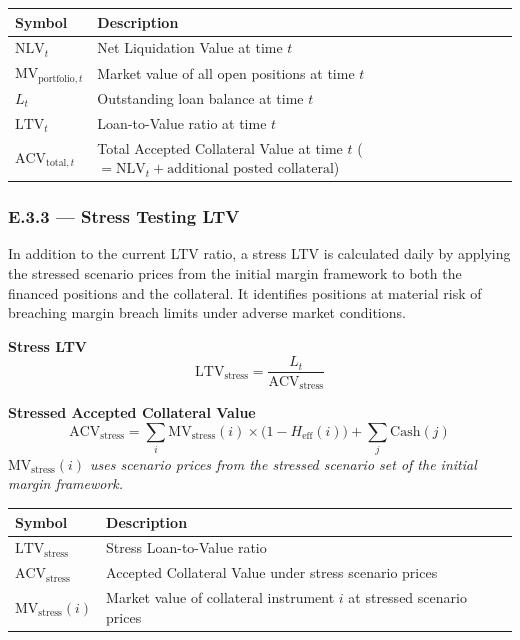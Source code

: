 \documentclass[9pt, a4paper]{extarticle}
\newenvironment{formulabox}{\par\addvspace{4pt}}{\par\addvspace{4pt}}
\newcommand{\vartableheader}{%
    \textbf{Symbol} & \textbf{Description}\\
}
\begin{document}
\begin{tabularx}{\linewidth}{lX}
\toprule
\vartableheader
\midrule
$\mathrm{NLV}_t$                   & Net Liquidation Value at time $t$ \\
$\mathrm{MV}_{\mathrm{portfolio},t}$ & Market value of all open positions at time $t$ \\
$L_t$                              & Outstanding loan balance at time $t$ \\
$\mathrm{LTV}_t$                   & Loan-to-Value ratio at time $t$ \\
$\mathrm{ACV}_{\mathrm{total},t}$  & Total Accepted Collateral Value at time $t$
                                     ($= \mathrm{NLV}_t + \text{additional posted collateral}$) \\
\bottomrule
\end{tabularx}

\subsubsection{E.3.3 — Stress Testing LTV}

In addition to the current LTV ratio, a stress LTV is calculated daily by
applying the stressed scenario prices from the initial margin framework to both
the financed positions and the collateral. It identifies positions at material
risk of breaching margin breach limits under adverse market conditions.

\begin{formulabox}
\textbf{Stress LTV}
\begin{equation*}
    \mathrm{LTV}_{\mathrm{stress}} =
        \frac{L_t}{\mathrm{ACV}_{\mathrm{stress}}}
\end{equation*}
\end{formulabox}

\begin{formulabox}
\textbf{Stressed Accepted Collateral Value}
\begin{equation*}
    \mathrm{ACV}_{\mathrm{stress}} =
        \sum_{i} \mathrm{MV}_{\mathrm{stress}}(i)
        \times \bigl(1 - H_{\mathrm{eff}}(i)\bigr)
        + \sum_{j} \mathrm{Cash}(j)
\end{equation*}
\textit{$\mathrm{MV}_{\mathrm{stress}}(i)$ uses scenario prices from the
stressed scenario set of the initial margin framework.}
\end{formulabox}

\begin{tabularx}{\linewidth}{lX}
\toprule
\vartableheader
\midrule
$\mathrm{LTV}_{\mathrm{stress}}$     & Stress Loan-to-Value ratio \\
$\mathrm{ACV}_{\mathrm{stress}}$     & Accepted Collateral Value under stress scenario prices \\
$\mathrm{MV}_{\mathrm{stress}}(i)$  & Market value of collateral instrument $i$
                                       at stressed scenario prices \\
\bottomrule
\end{tabularx}
\end{document}
